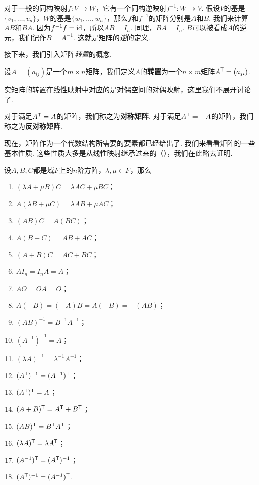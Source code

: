 对于一般的同构映射$f:V\to W$，它有一个同构逆映射$f^{-1}:W\to V$. 假设$V$的基是$\{v_1,\dots,v_n\}$，$W$的基是$\{w_1,\dots,w_n\}$，那么$f$和$f^{-1}$的矩阵分别是$A$和$B$. 我们来计算$AB$和$BA$. 因为$f^{-1}f=\mathrm{id}$，所以$AB=I_n$. 同理，$BA=I_n$. $B$可以被看成$A$的逆元，我们记作$B=A^{-1}$. 这就是矩阵的\textit{逆}的定义. 

接下来，我们引入矩阵\textit{转置}的概念. 

\begin{definition}[矩阵转置]
    设$A=(a_{ij})$是一个$m\times n$矩阵，我们定义$A$的\textbf{转置}为一个$n\times m$矩阵$A^{\mathsf{T}}=(a_{ji})$.
\end{definition}

实矩阵的转置在线性映射中对应的是对偶空间的对偶映射，这里我们不展开讨论了. 

对于满足$A^{\mathsf{T}}=A$的矩阵，我们称之为\textbf{对称矩阵}. 对于满足$A^{\mathsf{T}}=-A$的矩阵，我们称之为\textbf{反对称矩阵}. 

现在，矩阵作为一个代数结构所需要的要素都已经给出了. 我们来看看矩阵的一些基本性质. 这些性质大多是从线性映射继承过来的（），我们在此略去证明. 

\begin{proposition}\label{proposition:mat-basic}
    设$A,B,C$都是域$F$上的$n$阶方阵，$\lambda,\mu\in F$，那么
    \begin{enumerate}
        \item $(\lambda A+\mu B)C=\lambda AC+\mu BC$；
        \item $A(\lambda B+\mu C)=\lambda AB+\mu AC$；
        \item $(AB)C=A(BC)$；
        \item $A(B+C)=AB+AC$；
        \item $(A+B)C=AC+BC$；
        \item $AI_n=I_nA=A$；
        \item $AO=OA=O$；
        \item $A(-B)=(-A)B=A(-B)=-(AB)$；
        \item $(AB)^{-1}=B^{-1}A^{-1}$；
        \item $(A^{-1})^{-1}=A$；
        \item $(\lambda A)^{-1}=\lambda^{-1}A^{-1}$；
        \item $(A^{\mathsf{T}} )^{-1}=(A^{-1})^{\mathsf{T}} $；
        \item $(A^{\mathsf{T}} )^{\mathsf{T}} =A$；
        \item $(A+B)^{\mathsf{T}} =A^{\mathsf{T}} +B^{\mathsf{T}} $；
        \item $(AB)^{\mathsf{T}} =B^{\mathsf{T}} A^{\mathsf{T}} $；
        \item $(\lambda A)^{\mathsf{T}} =\lambda A^{\mathsf{T}} $；
        \item $(A^{-1})^{\mathsf{T}} =(A^{\mathsf{T}} )^{-1}$；
        \item $(A^{\mathsf{T}} )^{-1}=(A^{-1})^{\mathsf{T}} $.
    \end{enumerate}
\end{proposition}

